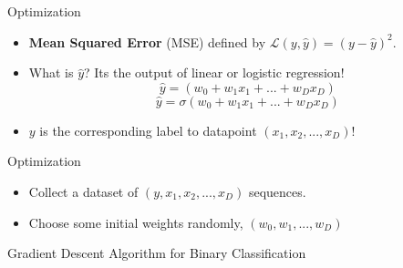 \begin{frame}{Optimization}
\begin{itemize}
    \item \textbf{Mean Squared Error} (MSE) defined by $\mathcal{L}(y, \hat{y}) = (y - \hat{y})^2$. 
    \item What is $\hat{y}$? Its the output of linear or logistic regression!
    $$\hat{y} =(w_0 + w_1x_1 + ... + w_Dx_D)$$
    $$\hat{y} = \sigma(w_0 + w_1x_1 + ... + w_Dx_D)$$
    \item $y$ is the corresponding label to datapoint $(x_1, x_2, ..., x_D)$!
\end{itemize}
\end{frame}

\begin{frame}{Optimization}
    \begin{itemize}
        \item Collect a dataset of $(y, x_1, x_2, ..., x_D)$ sequences.
        \item Choose some initial weights randomly, $(w_0, w_1, ..., w_D)$
    \end{itemize}
    \begin{algorithm}[H]
    \SetAlgoLined
     \caption{Gradient Descent Algorithm for Binary Classification}
    \end{algorithm}
    
    
\end{frame}